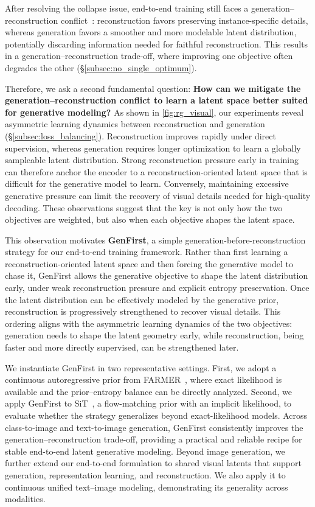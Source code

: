 \documentclass[]{bytedance_seed}
\newcommand{\sref}[1]{\S\ref{#1}}
\begin{document}
After resolving the collapse issue, end-to-end training still faces a generation--reconstruction conflict~\cite{vavae}: reconstruction favors preserving instance-specific details, whereas generation favors a smoother and more modelable latent distribution, potentially discarding information needed for faithful reconstruction. 
This results in a generation--reconstruction trade-off, where improving one objective often degrades the other (\sref{subsec:no_single_optimum}).

Therefore, we ask a second fundamental question: \textbf{How can we mitigate the generation--reconstruction conflict to learn a latent space better suited for generative modeling?}
As shown in \cref{fig:rg_visual}, our experiments reveal asymmetric learning dynamics between reconstruction and generation (\sref{subsec:loss_balancing}).
Reconstruction improves rapidly under direct supervision, whereas generation requires longer optimization to learn a globally sampleable latent distribution.
Strong reconstruction pressure early in training can therefore anchor the encoder to a reconstruction-oriented latent space that is difficult for the generative model to learn.
Conversely, maintaining excessive generative pressure can limit the recovery of visual details needed for high-quality decoding.
These observations suggest that the key is not only how the two objectives are weighted, but also when each objective shapes the latent space.


This observation motivates \textbf{GenFirst}, a simple generation-before-reconstruction strategy for our end-to-end training framework.
Rather than first learning a reconstruction-oriented latent space and then forcing the generative model to chase it, GenFirst allows the generative objective to shape the latent distribution early, under weak reconstruction pressure and explicit entropy preservation. 
Once the latent distribution can be effectively modeled by the generative prior, reconstruction is progressively strengthened to recover visual details.
This ordering aligns with the asymmetric learning dynamics of the two objectives: generation needs to shape the latent geometry early, while reconstruction, being faster and more directly
supervised, can be strengthened later.

We instantiate GenFirst in two representative settings. 
First, we adopt a continuous autoregressive prior from FARMER~\cite{zheng2025farmer}, where exact likelihood is available and the
prior--entropy balance can be directly analyzed.
Second, we apply GenFirst to SiT~\cite{sit}, a flow-matching prior with an implicit likelihood, to evaluate whether the strategy generalizes beyond exact-likelihood models. 
Across class-to-image and text-to-image generation, GenFirst consistently improves the generation--reconstruction trade-off, providing a practical and reliable recipe for stable end-to-end latent generative modeling.
Beyond image generation, we further extend our end-to-end formulation to shared visual latents that support generation, representation learning, and reconstruction.
We also apply it to continuous unified text--image modeling, demonstrating its generality across modalities.
\end{document}
